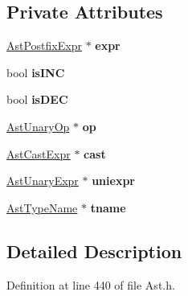 \subsection*{Private Attributes}
\begin{DoxyCompactItemize}
\item 
\hypertarget{classAstUnaryExpr_aba63616a6671ffe16f3cff6fd2bfd303}{\hyperlink{classAstPostfixExpr}{Ast\-Postfix\-Expr} $\ast$ {\bfseries expr}}\label{classAstUnaryExpr_aba63616a6671ffe16f3cff6fd2bfd303}

\item 
\hypertarget{classAstUnaryExpr_a76418e6a58878a1da236456a7e232168}{bool {\bfseries is\-I\-N\-C}}\label{classAstUnaryExpr_a76418e6a58878a1da236456a7e232168}

\item 
\hypertarget{classAstUnaryExpr_af5b5ac5242011e11a12a6697812ec459}{bool {\bfseries is\-D\-E\-C}}\label{classAstUnaryExpr_af5b5ac5242011e11a12a6697812ec459}

\item 
\hypertarget{classAstUnaryExpr_ae83e3998a7815424cdd8d3a78be10566}{\hyperlink{classAstUnaryOp}{Ast\-Unary\-Op} $\ast$ {\bfseries op}}\label{classAstUnaryExpr_ae83e3998a7815424cdd8d3a78be10566}

\item 
\hypertarget{classAstUnaryExpr_a50ed86402a6819ebb0523f97b2d673d1}{\hyperlink{classAstCastExpr}{Ast\-Cast\-Expr} $\ast$ {\bfseries cast}}\label{classAstUnaryExpr_a50ed86402a6819ebb0523f97b2d673d1}

\item 
\hypertarget{classAstUnaryExpr_a9102108e850ae380a4ffed810d414c71}{\hyperlink{classAstUnaryExpr}{Ast\-Unary\-Expr} $\ast$ {\bfseries uniexpr}}\label{classAstUnaryExpr_a9102108e850ae380a4ffed810d414c71}

\item 
\hypertarget{classAstUnaryExpr_a1cb4b566967e6236f41a719a2abcccbd}{\hyperlink{classAstTypeName}{Ast\-Type\-Name} $\ast$ {\bfseries tname}}\label{classAstUnaryExpr_a1cb4b566967e6236f41a719a2abcccbd}

\end{DoxyCompactItemize}


\subsection{Detailed Description}


Definition at line 440 of file Ast.\-h.




